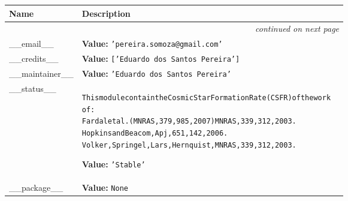     \vspace{-1cm}
\hspace{\varindent}\begin{longtable}{|p{\varnamewidth}|p{\vardescrwidth}|l}
\cline{1-2}
\cline{1-2} \centering \textbf{Name} & \centering \textbf{Description}& \\
\cline{1-2}
\endhead\cline{1-2}\multicolumn{3}{r}{\small\textit{continued on next page}}\\\endfoot\cline{1-2}
\endlastfoot\raggedright \_\-\_\-e\-m\-a\-i\-l\-\_\-\_\- & \raggedright \textbf{Value:} 
{\tt \texttt{'}\texttt{pereira.somoza@gmail.com}\texttt{'}}&\\
\cline{1-2}
\raggedright \_\-\_\-c\-r\-e\-d\-i\-t\-s\-\_\-\_\- & \raggedright \textbf{Value:} 
{\tt \texttt{[}\texttt{'}\texttt{Eduardo dos Santos Pereira}\texttt{'}\texttt{]}}&\\
\cline{1-2}
\raggedright \_\-\_\-m\-a\-i\-n\-t\-a\-i\-n\-e\-r\-\_\-\_\- & \raggedright \textbf{Value:} 
{\tt \texttt{'}\texttt{Eduardo dos Santos Pereira}\texttt{'}}&\\
\cline{1-2}
\raggedright \_\-\_\-s\-t\-a\-t\-u\-s\-\_\-\_\- & \raggedright \begin{alltt}
This module contain the Cosmic Star Formation Rate (CSFR) of the work
of:
    Fardal et al. (MNRAS, 379,985,2007) MNRAS, 339,312,2003.
    Hopkins and Beacom, Apj, 651, 142, 2006.
    Volker, Springel, Lars, Hernquist, MNRAS, 339,312,2003.
\end{alltt}

\textbf{Value:} 
{\tt \texttt{'}\texttt{Stable}\texttt{'}}&\\
\cline{1-2}
\raggedright \_\-\_\-p\-a\-c\-k\-a\-g\-e\-\_\-\_\- & \raggedright \textbf{Value:} 
{\tt None}&\\
\cline{1-2}
\end{longtable}

